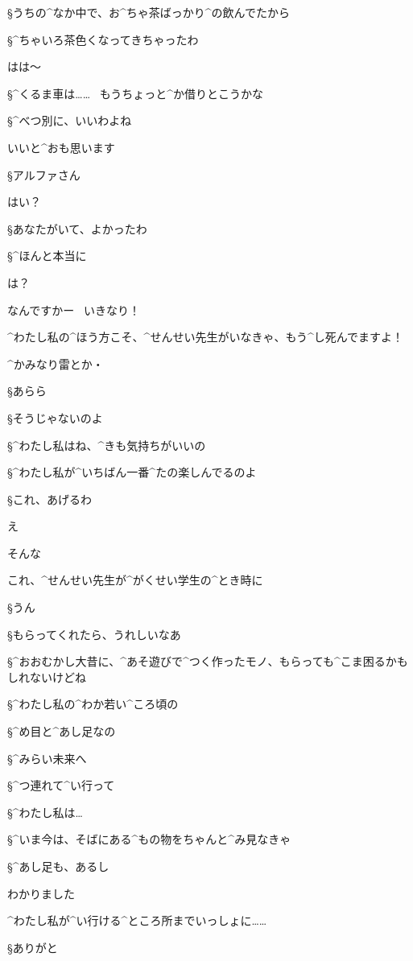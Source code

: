 \page
\S うちの^{なか}{中}で、お^{ちゃ}{茶}ばっかり^{の}{飲}んでたから

\S ^{ちゃいろ}{茶色}くなってきちゃったわ

\A はは〜

\S ^{くるま}{車}は……
\ もうちょっと^{か}{借}りとこうかな

\S ^{べつ}{別}に、いいわよね

\A いいと^{おも}{思}います

\page[25]
\S アルファさん

\A はい？

\page
\S あなたがいて、よかったわ

\S ^{ほんと}{本当}に

\A は？

\page
\A なんですかー
\ いきなり！

\A ^{わたし}{私}の^{ほう}{方}こそ、^{せんせい}{先生}がいなきゃ、もう^{し}{死}んでますよ！

\A ^{かみなり}{雷}とか・

\S あらら

\S そうじゃないのよ

\S ^{わたし}{私}はね、^{きも}{気持}ちがいいの

\S ^{わたし}{私}が^{いちばん}{一番}^{たの}{楽}しんでるのよ

\page
\S これ、あげるわ

\A え

\page
\A そんな

\A これ、^{せんせい}{先生}が^{がくせい}{学生}の^{とき}{時}に

\S うん

\S もらってくれたら、うれしいなあ

\S ^{おおむかし}{大昔}に、^{あそ}{遊}びで^{つく}{作}ったモノ、もらっても^{こま}{困}るかもしれないけどね

\S ^{わたし}{私}の^{わか}{若}い^{ころ}{頃}の

\S ^{め}{目}と^{あし}{足}なの

\page
\S ^{みらい}{未来}へ

\S ^{つ}{連}れて^{い}{行}って

\S ^{わたし}{私}は…

\S ^{いま}{今}は、そばにある^{もの}{物}をちゃんと^{み}{見}なきゃ

\page
\S ^{あし}{足}も、あるし

\A わかりました

\A ^{わたし}{私}が^{い}{行}ける^{ところ}{所}までいっしょに……

\S ありがと


